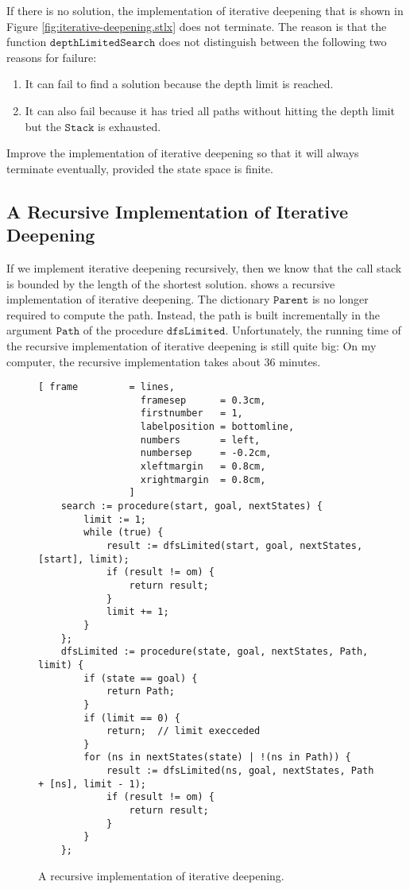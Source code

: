 \exercise 
If there is no solution, the implementation of iterative deepening that is shown in Figure
\ref{fig:iterative-deepening.stlx} does not terminate.  The reason is that the function $\mathtt{depthLimitedSearch}$ does not
distinguish between the following two reasons for failure:
\begin{enumerate}
\item It can fail to find a solution because the depth limit is reached.
\item It can also fail because it has tried all paths without hitting the depth limit but the $\mathtt{Stack}$ is exhausted.  
\end{enumerate}
Improve the implementation of iterative deepening so that it will always terminate eventually, provided the
state space is finite. 
\eoxs

\subsection{A Recursive Implementation of Iterative Deepening}
If we implement iterative deepening recursively, then we know that the call stack is bounded by the length of
the shortest solution.    
shows a recursive implementation of iterative deepening.   The dictionary $\mathtt{Parent}$ is no longer
required to compute the path.  Instead, the path is built 
incrementally in the argument $\mathtt{Path}$ of the procedure $\mathtt{dfsLimited}$.
Unfortunately, the running time of the recursive implementation of iterative deepening is still
quite big:  On my computer, the recursive implementation takes about 36 minutes.


\begin{figure}[!ht]
\centering
\begin{Verbatim}[ frame         = lines, 
                  framesep      = 0.3cm, 
                  firstnumber   = 1,
                  labelposition = bottomline,
                  numbers       = left,
                  numbersep     = -0.2cm,
                  xleftmargin   = 0.8cm,
                  xrightmargin  = 0.8cm,
                ]
    search := procedure(start, goal, nextStates) {
        limit := 1;  
        while (true) {
            result := dfsLimited(start, goal, nextStates, [start], limit);
            if (result != om) {
                return result;
            }
            limit += 1;
        }
    };
    dfsLimited := procedure(state, goal, nextStates, Path, limit) {
        if (state == goal) {
            return Path;
        }
        if (limit == 0) {
            return;  // limit execceded
        }
        for (ns in nextStates(state) | !(ns in Path)) {
            result := dfsLimited(ns, goal, nextStates, Path + [ns], limit - 1);
            if (result != om) {
                return result;
            }   
        }
    };
\end{Verbatim}
\vspace*{-0.3cm}
\caption{A recursive implementation of iterative deepening.}
\label{fig:iterative-deepening-recursive.stlx}
\end{figure}

